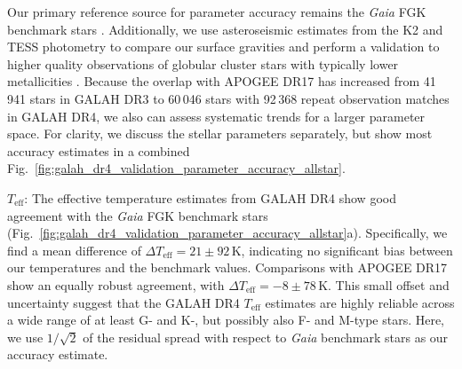 \documentclass[
  journal=pasa,
  manuscript=research-paper, %
  year=2024,
  volume=37
]{cup-journal}
\newcommand{\Teff}{$T_\mathrm{eff}$\xspace}
\newcommand{\Gaia}{\textit{Gaia}\xspace}
\begin{document}
Our primary reference source for parameter accuracy remains the \Gaia FGK benchmark stars \citep{Jofre2014, Jofre2015, Jofre2018, Heiter2015}. Additionally, we use asteroseismic estimates from the K2 and TESS photometry \citep{Zinn2020, Hon2021} to compare our surface gravities and perform a validation to higher quality observations of globular cluster stars with typically lower metallicities \citep{Carretta2009c, Carretta2009, Johnson2010}. Because the overlap with APOGEE DR17 \citep{SDSSDR17} has increased from 41\,941 stars in GALAH DR3 to 60\,046 stars with 92\,368 repeat observation matches in GALAH DR4, we also can assess systematic trends for a larger parameter space. For clarity, we discuss the stellar parameters separately, but show most accuracy estimates in a combined Fig.~\ref{fig:galah_dr4_validation_parameter_accuracy_allstar}.

\Teff: The effective temperature estimates from GALAH DR4 show good agreement with the \Gaia FGK benchmark stars (Fig.~\ref{fig:galah_dr4_validation_parameter_accuracy_allstar}a). Specifically, we find a mean difference of $\Delta T_\mathrm{eff} = 21 \pm 92\,\mathrm{K}$, indicating no significant bias between our temperatures and the benchmark values. Comparisons with APOGEE DR17 show an equally robust agreement, with $\Delta T_\mathrm{eff} = -8 \pm 78\,\mathrm{K}$. This small offset and uncertainty suggest that the GALAH DR4 \Teff estimates are highly reliable across a wide range of at least G- and K-, but possibly also F- and M-type stars. Here, we use $1/\sqrt{2}$ of the residual spread with respect to \Gaia benchmark stars as our accuracy estimate.
\end{document}
